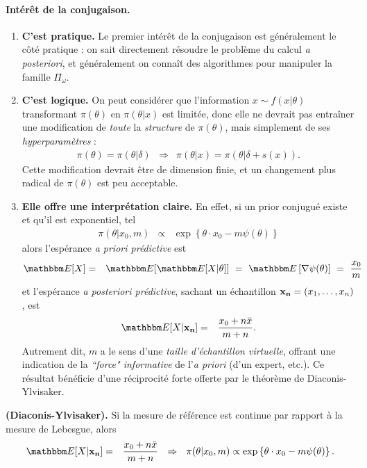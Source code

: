 \paragraph{Intérêt de la conjugaison.} 
\begin{enumerate}
\item {\bf C'est pratique.} Le premier intérêt de la conjugaison est généralement le côté pratique : on sait directement résoudre le problème du calcul {\it a posteriori}, et généralement on connaît des algorithmes pour manipuler la famille $\Pi_{\omega}$. 
\item {\bf C'est logique.} On peut considérer que l'information $x\sim f(x|\theta)$ transformant $\pi(\theta)$ en $\pi(\theta|x)$ est limitée, donc elle ne devrait pas entra\^iner une modification de {\it toute} la \emph{structure} de $\pi(\theta)$, mais simplement de ses \emph{hyperparamètres} :
\begin{eqnarray*}
\pi(\theta) = \pi(\theta|\delta) & \Rightarrow & \pi(\theta|x) = \pi(\theta|\delta + s(x)).
\end{eqnarray*}
Cette modification devrait être de dimension finie, et un changement plus radical de $\pi(\theta)$ est peu acceptable.
\item {\bf Elle offre une interprétation claire.} En effet, si un prior conjugué existe et qu'il est exponentiel, tel
\begin{eqnarray*}
\pi(\theta|x_0,m) & \propto &  \exp\left\{\theta\cdot x_0 - m\psi(\theta)\right\} 
\end{eqnarray*} 
alors l'espérance {\it a priori prédictive} est
\begin{eqnarray*}
\E[X] & = & \E[\E[X|\theta]] \ = \ \E\left[\nabla\psi(\theta)\right] \ = \ \frac{x_0}{m}
\end{eqnarray*} 
et l'espérance {\it a posteriori prédictive}, sachant un échantillon ${\bf x_n}=(x_1,\ldots,x_n)$, est
\begin{eqnarray}
\E[X|{\bf x_n}] & = & \frac{x_0 + n\bar{x}}{m + n}. \label{linearitetototutu}
\end{eqnarray} 
Autrement dit, $m$ a le sens d'une \emph{taille d'échantillon virtuelle}, offrant une indication de la \emph{``force" informative} de l'{\it a priori} (d'un expert, etc.). Ce résultat bénéficie d'une réciprocité forte offerte par le théorème de Diaconis-Ylvisaker.
\end{enumerate}

\begin{theorem}{\bf (Diaconis-Ylvisaker).}
Si la mesure de référence est continue par rapport à la mesure de Lebesgue, alors
\begin{eqnarray*}
\E[X|{\bf x_n}] & = & \frac{x_0 + n\bar{x}}{m + n} \ \ \Rightarrow \ \ \pi(\theta|x_0,m)  \propto   \exp\left\{\theta\cdot x_0 - m\psi(\theta)\right\}.
\end{eqnarray*}
\end{theorem}


